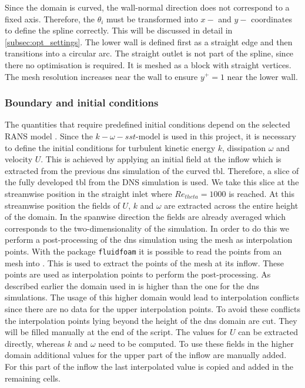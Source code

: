 Since the domain is curved, the wall-normal direction does not correspond to a fixed axis. 
Therefore, the  $\theta_i$ must be transformed into  $x-$ and $y-$ coordinates to define the spline correctly.
This will be discussed in detail in \autoref{subsec:opt_settings}.
The lower wall is defined first as a straight edge and then transitions into a circular arc.
The straight outlet is not part of the spline, since there no optimisation is required.
It is meshed as a block with straight vertices.
The mesh resolution increases near the wall to ensure $y^+ = 1$ near the lower wall.






\subsubsection{Boundary and initial conditions}
The quantities that require predefined initial conditions depend on the selected RANS model . 
Since  the $k-\omega-sst$-model is used in this project, it is necessary to define the initial conditions for turbulent kinetic energy $k$, dissipation $\omega$ and velocity $U$. 
This is achieved by applying an initial field at the inflow which is extracted from the previous \acrshort{dns} simulation of the curved \acrshort{tbl}.
Therefore, a slice of the fully developed \acrshort{tbl} from the DNS simulation is used.
We take this slice at the streamwise position in the straight inlet where $Re_{theta} = 1000$ is reached.
At this streamwise position the fields of $U$, $k$ and $\omega$ are extracted across the entire height of the domain. 
In the spanwise direction the fields are already averaged which corresponds to the two-dimensionality of the  simulation.
In order to do this we perform a post-processing of the \acrshort{dns} simulation using the  mesh as interpolation points.
With the  package \texttt{fluidfoam} it is possible to read the points from an  mesh into . 
This is used to extract the points of the  mesh at its inflow.
These points are used as interpolation points to perform the post-processing. 
As described earlier the domain used in  is higher than the one for the \acrshort{dns} simulations.
The usage of this higher domain would lead to interpolation conflicts since there are no data for the upper interpolation points. 
To avoid these conflicts the interpolation points lying beyond the height of the \acrshort{dns} domain are cut.
They will be filled manually at the end of the script.
The values for $U$ can be extracted directly, whereas $k$ and $\omega$ need to be computed. 
To use these fields in the higher  domain additional values for the upper part of the inflow are manually added. 
For this part of the inflow the last interpolated value is copied and added in the remaining cells.

